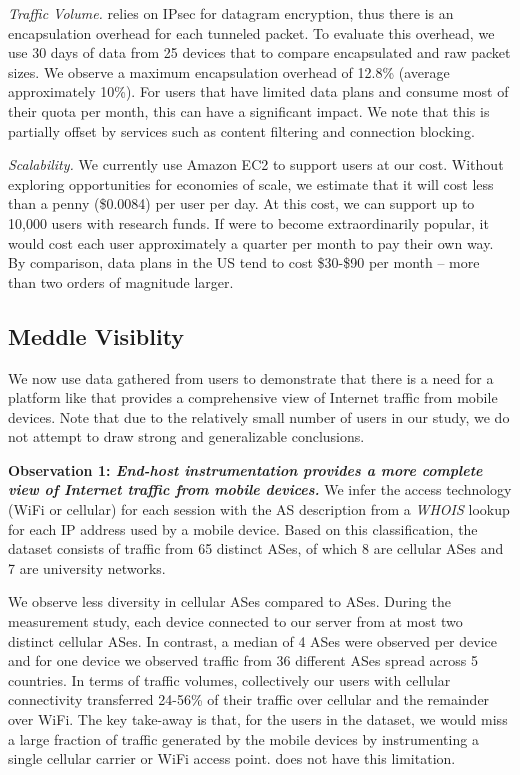 \noindent\emph{Traffic Volume.}
\meddle relies on IPsec for datagram encryption, thus there is an encapsulation overhead for each tunneled packet. 
To evaluate this overhead, we use 30 days of data from 25 devices that to compare encapsulated and raw packet sizes. 
We observe a maximum encapsulation overhead of 12.8\% (average approximately 10\%). 
For users that have limited data plans and consume most of their quota per month, this can have 
a significant impact. We note that this is partially offset by \meddle services such as content filtering and 
connection blocking. %

\noindent\emph{Scalability.} We currently use Amazon EC2 to support users at our cost. 
Without exploring opportunities for economies of scale, we estimate that 
it will cost less than a penny (\$0.0084) per user per day. At this cost, we can support up to 
10,000 users with research funds. If \meddle were to become extraordinarily popular, it would 
cost each user approximately a quarter per month to pay their own way. By comparison, 
data plans in the US tend to cost \$30-\$90 per month -- more than two orders of magnitude larger.

\subsection{Meddle Visiblity}

We now use data gathered from users to demonstrate that there is a need for a platform like \meddle that provides a comprehensive view of Internet traffic from mobile devices. 
Note that due to the relatively small number of users in our study, we do not attempt to  
draw strong and generalizable conclusions. 

\noindent\textbf{Observation 1: \emph{End-host instrumentation provides a more complete view of 
Internet traffic from mobile devices.}} We infer the access technology (WiFi or cellular) for 
each session with the AS description from a \emph{WHOIS} lookup for each IP address used by a mobile device.
Based on this classification, the \mobWild dataset consists of traffic from 65 distinct ASes, of which 8 are cellular ASes and 7 are university networks.

We observe less diversity in cellular ASes compared to \wifi ASes.
During the measurement study, each device connected to our \platname server from at most two distinct cellular ASes. 
In contrast, a median of 4 \wifi ASes were observed per device and for one device we observed traffic from 36 different \wifi ASes spread across 5 countries.
In terms of traffic volumes, collectively our users with cellular connectivity transferred 24-56\% of their traffic over cellular and the remainder over WiFi. 
The key take-away is that, for the users in the \mobWild dataset, we would miss a large fraction of traffic generated by the mobile devices by instrumenting a single cellular carrier or WiFi access point. 
\meddle does not have this limitation.

